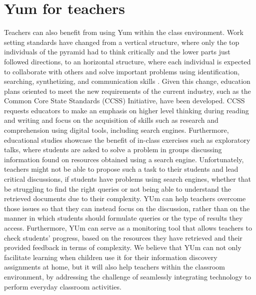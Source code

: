 \documentclass{sig-alternate-05-2015}
\begin{document}
\section{Yum for teachers}
Teachers can also benefit from using Yum within the class environment. Work setting standards have changed from a vertical structure, where only the top individuals of the pyramid had to think critically and the lower parts just followed directions, to an horizontal structure, where each individual is expected to collaborate with others and solve important problems using identification, searching, synthetizing, and communication skills \cite{leu13}. Given this change, education plans oriented to meet the new requirements of the current industry, such as the Common Core State Standards (CCSS) Initiative, have been developed. CCSS requests educators to make an emphasis on higher level thinking during reading and writing and focus on the acquisition of skills such as research and comprehension using digital tools, including search engines\cite{leu13}. Furthermore, educational studies \cite{kni15} showcase the benefit of in-class exercises such as  exploratory talks, where students are asked to solve a problem in groups discussing information found on resources obtained using a search engine. Unfortunately, teachers might not be able to propose such a task to their students and lead critical discussions, if students have problems using search engines, whether that be struggling to  find the right queries or not being able to  understand the retrieved documents due to their complexity. YUm can help teachers overcome those issues so that they can instead focus on the discussion, rather than on the manner in which students should formulate queries or the type of results they access. Furthermore, YUm can serve as a monitoring tool that allows teachers to check students' progress, based on the resources they have retrieved and their provided feedback in terms of complexity. We believe that  YUm can  not only facilitate learning when children use it for their information discovery assignments at home, but it will also help teachers within the classroom environment, by  addressing the challenge of seamlessly integrating technology to perform everyday classroom activities\cite{Dan13,kni15}.
\end{document}
